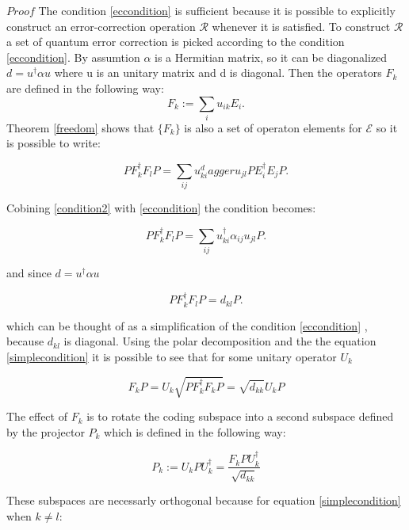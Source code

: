 \documentclass{article}
\begin{document}
$Proof$
The condition \ref{eccondition} is sufficient because it
is possible to explicitly construct an error-correction operation
$\mathcal{R}$ whenever it is satisfied.
To construct $\mathcal{R}$ a set of quantum error correction is picked
according to the condition \ref{eccondition}.
By assumtion $\alpha$ is a Hermitian matrix, so it can be diagonalized
$d =u^\dagger \alpha u$ where u is an unitary matrix and d is diagonal.
Then the operators $F_k$ are defined in the following way:
\begin{equation}
	F_k := \sum_i u_{ik} E_i.
\end{equation}
Theorem \ref{freedom} shows that $\{F_k\}$ is also a set of operaton
elements for $\mathcal{E}$ so it is possible to write:

\begin{equation}
	\label{condition2}
	P F_k^\dagger F_l P = \sum_{ij} u_{ki}^dagger u_{jl} P E_{i}^\dagger E_j P.
\end{equation}

Cobining \ref{condition2} with \ref{eccondition}
the condition becomes:

\begin{equation}
	P F_k^\dagger F_l P = \sum_{ij} u_{ki}^\dagger \alpha_{ij} u_{jl} P.
\end{equation}

and since $d = u^\dagger \alpha u$

\begin{equation}
	\label{simplecondition}
	P F_k^\dagger F_l P = d_{kl}P.
\end{equation}

which can be thought of as a simplification of the condition \ref{eccondition} ,
because $d_{kl}$ is diagonal.
Using the polar decomposition and the the equation \ref{simplecondition} it is
possible to see that for some unitary operator $U_k$

\begin{equation}
	F_k P = U_k \sqrt{PF_k^\dagger F_k P} = \sqrt{d_{kk}} U_k P
\end{equation}

The effect of $F_k$ is to rotate the coding subspace into a second subspace defined by
the projector $P_k$ which is defined in the following way:

\begin{equation}
	\label{defpk}
	P_k := U_k P U_k^\dagger = \dfrac{F_k P U_k^\dagger}{\sqrt{d_{kk}}}
\end{equation}

These subspaces are necessarly orthogonal because for equation \ref{simplecondition}
when $k \neq l$:
\end{document}
